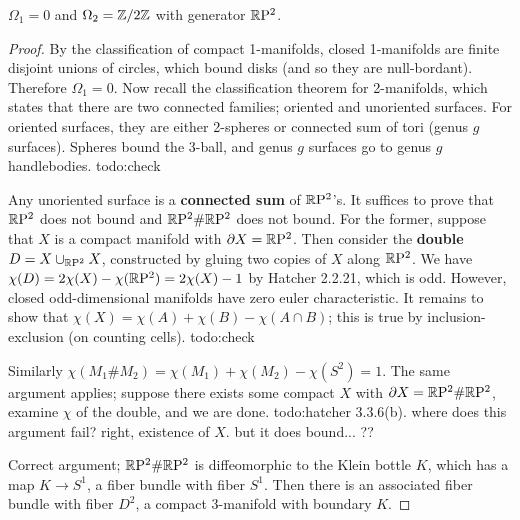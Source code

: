 \begin{prop}
    $\Omega_1=0$ and $\Omega_2=\mathbb{Z} /2\mathbb{Z}$ with generator $\mathbb{R} \mathrm P^2$.
\end{prop}
\begin{proof}
    By the classification of compact 1-manifolds, closed 1-manifolds are finite disjoint unions of circles,  which bound disks (and so they are null-bordant). Therefore $\Omega_1=0$. Now recall the classification theorem for 2-manifolds, which states that there are two connected families; oriented and unoriented surfaces. For oriented surfaces, they are either 2-spheres or connected sum of tori (genus $g$ surfaces). Spheres bound the 3-ball, and genus $g$ surfaces go to genus $g$ handlebodies. {\color{red}todo:check} 

    Any unoriented surface is a \textbf{connected sum} of $\mathbb{R} \mathrm P^2$'s. It suffices to prove that $\mathbb{R} \mathrm P^2$ does not bound and $\mathbb{R} \mathrm P^2\# \mathbb{R} \mathrm P^2$ does not bound. For the former, suppose that $X$ is a compact manifold with $\partial X=\mathbb{R} \mathrm P^2$. Then consider the \textbf{double} $D= X \cup _{\mathbb{R} \mathrm P^2}X$, constructed by gluing two copies of $X$ along $\mathbb{R} \mathrm P^2$. We have $\chi(D)=2\chi(X)-\chi(\mathbb{R} \mathrm P^2)=2\chi(X)-1$ by Hatcher 2.2.21, which is odd. However, closed odd-dimensional manifolds have zero euler characteristic. It remains to show that $\chi(X)=\chi(A)+\chi(B)-\chi(A\cap B)$; this is true by inclusion-exclusion (on counting cells). {\color{red}todo:check} 

    Similarly $\chi(M_1 \# M_2)=\chi(M_1)+\chi(M_2)-\chi(S^2 )=1$. The same argument applies; suppose there exists some compact $X$ with $\partial X=\mathbb{R} \mathrm P^2\# \mathbb{R} \mathrm P^2$, examine $\chi$ of the double, and we are done. {\color{red}todo:hatcher 3.3.6(b). where does this argument fail? right, existence of $X$. but it does bound... ??} 

    Correct argument; $\mathbb{R} \mathrm P^2\# \mathbb{R} \mathrm P^2$ is diffeomorphic to the Klein bottle $K$, which has a map  $K \to S^1 $, a fiber bundle with fiber $S^1 $. Then there is an associated fiber bundle with fiber $D^2$, a compact 3-manifold with boundary $K$.
\end{proof}

